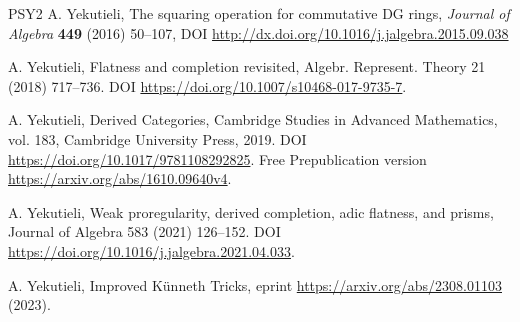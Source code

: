 \documentclass[10pt]{amsart}
\theoremstyle{definition}
\numberwithin{equation}{section}
\begin{document}
\begin{thebibliography}{PSY2}
 A. Yekutieli,
The squaring operation for commutative DG rings,
{\em Journal of Algebra} {\bf 449} (2016) 50–107,
DOI \url{http://dx.doi.org/10.1016/j.jalgebra.2015.09.038}

 A. Yekutieli, Flatness and completion revisited, Algebr.
Represent. Theory 21 (2018) 717–736.
DOI \url{https://doi.org/10.1007/s10468-017-9735-7}.

 A. Yekutieli, Derived Categories, Cambridge Studies in
Advanced Mathematics, vol. 183, Cambridge
University Press, 2019.
DOI \url{https://doi.org/10.1017/9781108292825}.
Free Prepublication version
\url{https://arxiv.org/abs/1610.09640v4}.

 A. Yekutieli,
Weak proregularity, derived completion, adic flatness, and prisms,
Journal of Algebra 583 (2021) 126–152.
DOI \url{https://doi.org/10.1016/j.jalgebra.2021.04.033}.

 A. Yekutieli,
Improved K\"unneth Tricks,
eprint \url{https://arxiv.org/abs/2308.01103} (2023).

\end{thebibliography}
\end{document}
